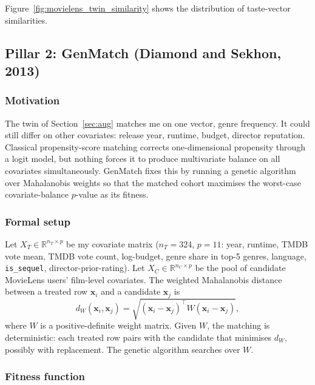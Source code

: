 \documentclass{article}
\begin{document}
Figure~\ref{fig:movielens_twin_similarity} shows the distribution of taste-vector similarities.

\subsection{Pillar 2: GenMatch (Diamond and Sekhon, 2013)}

\subsubsection*{Motivation}

The twin of Section~\ref{sec:aug} matches me on one vector, genre frequency. It could still differ on other covariates: release year, runtime, budget, director reputation. Classical propensity-score matching corrects one-dimensional propensity through a logit model, but nothing forces it to produce multivariate balance on all covariates simultaneously. GenMatch fixes this by running a genetic algorithm over Mahalanobis weights so that the matched cohort maximises the worst-case covariate-balance $p$-value as its fitness.

\subsubsection*{Formal setup}

Let $X_T \in \mathbb{R}^{n_T \times p}$ be my covariate matrix ($n_T = 324$, $p = 11$: year, runtime, TMDB vote mean, TMDB vote count, log-budget, genre share in top-5 genres, language, \texttt{is\_sequel}, director-prior-rating). Let $X_C \in \mathbb{R}^{n_C \times p}$ be the pool of candidate MovieLens users' film-level covariates. The weighted Mahalanobis distance between a treated row $\mathbf{x}_i$ and a candidate $\mathbf{x}_j$ is
\begin{equation}
d_W(\mathbf{x}_i, \mathbf{x}_j) = \sqrt{(\mathbf{x}_i - \mathbf{x}_j)^\top W (\mathbf{x}_i - \mathbf{x}_j)},
\label{eq:mahal}
\end{equation}
where $W$ is a positive-definite weight matrix. Given $W$, the matching is deterministic: each treated row pairs with the candidate that minimises $d_W$, possibly with replacement. The genetic algorithm searches over $W$.

\subsubsection*{Fitness function}
\end{document}
